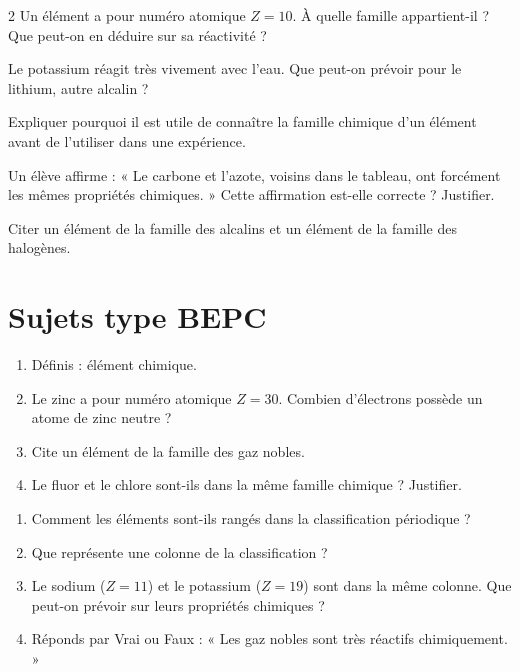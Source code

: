 \begin{multicols}{2}
\exo{} Un élément a pour numéro atomique $Z=10$. À quelle famille appartient-il
? Que peut-on en déduire sur sa réactivité ?

\exo{} Le potassium réagit très vivement avec l'eau. Que peut-on prévoir pour le
lithium, autre alcalin ?

\exo{} Expliquer pourquoi il est utile de connaître la famille chimique d'un
élément avant de l'utiliser dans une expérience.

\exo{} Un élève affirme : « Le carbone et l'azote, voisins dans le tableau, ont
forcément les mêmes propriétés chimiques. » Cette affirmation est-elle correcte ?
Justifier.

\exo{} Citer un élément de la famille des alcalins et un élément de la famille
des halogènes.

\end{multicols}

\section{Sujets type BEPC}

\begin{enumerate}[label=\arabic*)]
\item Définis : élément chimique.
\item Le zinc a pour numéro atomique $Z=30$. Combien d'électrons possède un atome de zinc
neutre ?
\item Cite un élément de la famille des gaz nobles.
\item Le fluor et le chlore sont-ils dans la même famille chimique ? Justifier.
\end{enumerate}

\begin{enumerate}[label=\arabic*)]
\item Comment les éléments sont-ils rangés dans la classification périodique ?
\item Que représente une colonne de la classification ?
\item Le sodium ($Z=11$) et le potassium ($Z=19$) sont dans la même colonne. Que peut-on
prévoir sur leurs propriétés chimiques ?
\item Réponds par Vrai ou Faux : « Les gaz nobles sont très réactifs chimiquement. »
\end{enumerate}

